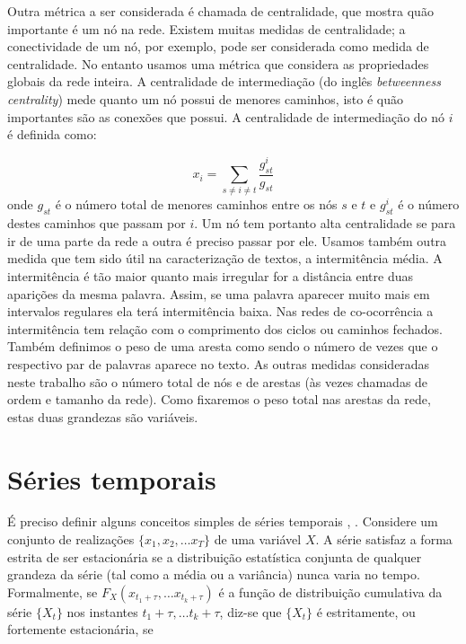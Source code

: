 \documentclass[a4paper,openright,12pt]{report} %
\begin{document}
Outra m\'etrica a ser considerada \'e chamada de centralidade, que mostra qu\~ao importante \'e um n\'o na rede. Existem muitas medidas de centralidade; a conectividade de um n\'o, por exemplo, pode ser considerada como medida de centralidade. No entanto usamos uma m\'etrica que considera as propriedades globais da rede inteira. A centralidade de intermedia\c c\~ao (do ingl\^es \textit{betweenness centrality}) mede quanto um n\'o possui de  menores caminhos, isto \'e qu\~ao importantes s\~ao as conex\~oes que possui. A centralidade de intermedia\c c\~ao do n\'o $i$ \'e definida como:

\begin{equation}
x_i = \sum_{s\neq i\neq t} \frac{g_{st}^i}{g_{st}}
\label{eq:bc}
\end{equation}
onde $g_{st}$ \'e o n\'umero total de menores caminhos entre os n\'os $s$ e $t$ e $g_{st}^i$ \'e o n\'umero destes caminhos que passam por $i$. Um n\'o tem portanto alta centralidade se para ir de uma parte da rede a outra \'e preciso passar por ele. Usamos tamb\'em outra medida que tem sido \'util na caracteriza\c c\~ao de textos, a intermit\^encia m\'edia. 
A intermit\^encia \'e t\~ao maior quanto mais irregular for a dist\^ancia entre duas apari\c c\~oes da mesma palavra. Assim, se uma palavra aparecer muito mais em intervalos regulares ela ter\'a intermit\^encia baixa. 
Nas redes de co-ocorr\^encia a intermit\^encia tem rela\c c\~ao com o comprimento dos ciclos ou caminhos fechados. 
Tamb\'em definimos o peso de uma aresta como sendo o n\'umero de vezes que o respectivo par de palavras aparece no texto. As outras medidas consideradas neste trabalho s\~ao o n\'umero total de n\'os e de arestas (\`as vezes chamadas de ordem e tamanho da rede). Como fixaremos o peso total nas arestas da rede, estas duas grandezas s\~ao vari\'aveis. 


\section{S\'eries temporais}

\'E preciso definir alguns conceitos simples de s\'eries temporais \cite{chatfield2013analysis}, \cite{hamilton1994time}. Considere um conjunto de realiza\c c\~oes $\{ x_1, x_2, \dots x_T \}$ de uma vari\'avel $X$. A s\'erie satisfaz a forma estrita de ser estacion\'aria se a distribui\c c\~ao estat\'istica conjunta de qualquer grandeza da s\'erie (tal como a m\'edia ou a vari\^ancia) nunca varia no tempo. Formalmente, se $F_X(x_{t_1+\tau}, \dots x_{t_k+\tau})$ \'e a fun\c c\~ao de distribui\c c\~ao cumulativa da s\'erie $\{X_t\}$ nos instantes $t_1+\tau, \dots t_k+\tau$, diz-se que $\{X_t\}$ \'e estritamente, ou fortemente estacion\'aria, se
\end{document}
